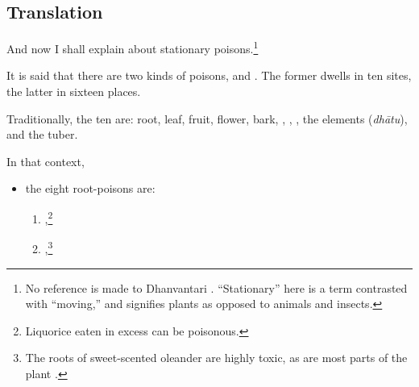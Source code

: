 \subsection{Translation}

\begin{translation}
    
    \item[1]
    And now I shall explain  about stationary 
    poisons.\footnote{No reference is made to Dhanvantari 
    \citep[see][]{birc-2021}. “Stationary” here is a term contrasted with “moving,” 
    and signifies plants as opposed to animals and insects.}
  
    \item[3]
    \noindent It is said that there are two kinds of poisons,
     and . The former
    dwells in ten sites, the latter in sixteen places.
   
    \item[4]
    Traditionally, the ten are: root, leaf, fruit, flower, bark,
    , , , the
    elements (\emph{dhātu}), and the tuber.

    \item[5]
    
    In that context,\label{poisonousplants}
    \begin{itemize}
        \item
        the eight root-poisons are:
        \begin{enumerate}
        \item {},\footnote{Liquorice eaten in excess can be poisonous.}
       
        \item {},\footnote{The roots of sweet-scented oleander 
        are highly toxic, as are most parts of the plant \citep{pill-2019}.}
    

\end{enumerate}
\end{itemize}
\end{translation}
